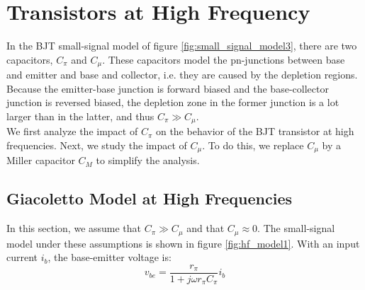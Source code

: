 \chapter{Transistors at High Frequency}
In the BJT small-signal model of figure \ref{fig:small_signal_model3}, there are two capacitors, $C_{\pi}$ and $C_{\mu}$. These capacitors model the pn-junctions between base and emitter and base and collector, i.e. they are caused by the depletion regions. Because the emitter-base junction is forward biased and the base-collector junction is reversed biased, the depletion zone in the former junction is a lot larger than in the latter, and thus $C_{\pi} \gg C_{\mu}$.\\
We first analyze the impact of $C_{\pi}$ on the behavior of the BJT transistor at high frequencies. Next, we study the impact of $C_{\mu}$. To do this, we replace $C_{\mu}$ by a Miller capacitor $C_M$ to simplify the analysis.

\section{Giacoletto Model at High Frequencies}
In this section, we assume that $C_{\pi} \gg C_{\mu}$ and that $C_{\mu} \approx 0$. The small-signal model under these assumptions is shown in figure \ref{fig:hf_model1}. With an input current $i_b$, the base-emitter voltage is:
$$
v_{be} = \frac{r_{\pi}}{1 + j \omega r_{\pi} C_{\pi}} i_b
$$

